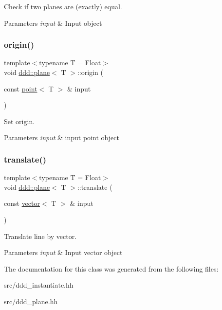 Check if two planes are (exactly) equal. 


\begin{DoxyParams}{Parameters}
{\em input} & Input object \\
\hline
\end{DoxyParams}
\mbox{\label{classddd_1_1plane_ac820ca045c22c4f4672adc9efd8b8cf3}} 
\subsubsection{\texorpdfstring{origin()}{origin()}}
{\footnotesize\ttfamily template$<$typename T = Float$>$ \\
void \hyperlink{classddd_1_1plane}{ddd\+::plane}$<$ T $>$\+::origin (\begin{DoxyParamCaption}\item[{const \hyperlink{classddd_1_1point}{point}$<$ T $>$ \&}]{input }\end{DoxyParamCaption})\hspace{0.3cm}{\ttfamily [inline]}}



Set origin. 


\begin{DoxyParams}{Parameters}
{\em input} & input point object \\
\hline
\end{DoxyParams}
\mbox{\label{classddd_1_1plane_a452cbfa144468d3748b424b18f045c24}} 
\subsubsection{\texorpdfstring{translate()}{translate()}}
{\footnotesize\ttfamily template$<$typename T = Float$>$ \\
void \hyperlink{classddd_1_1plane}{ddd\+::plane}$<$ T $>$\+::translate (\begin{DoxyParamCaption}\item[{const \hyperlink{classddd_1_1vector}{vector}$<$ T $>$ \&}]{input }\end{DoxyParamCaption})\hspace{0.3cm}{\ttfamily [inline]}}



Translate line by vector. 


\begin{DoxyParams}{Parameters}
{\em input} & Input vector object \\
\hline
\end{DoxyParams}


The documentation for this class was generated from the following files\+:\begin{DoxyCompactItemize}
\item 
src/ddd\+\_\+instantiate.\+hh\item 
src/ddd\+\_\+plane.\+hh\end{DoxyCompactItemize}
